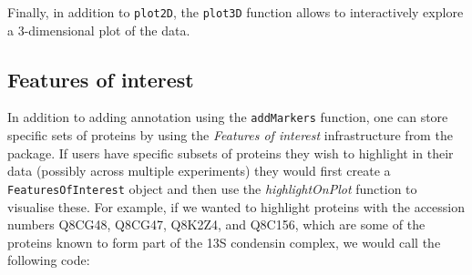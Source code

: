 Finally, in addition to \texttt{plot2D}, the \texttt{plot3D} function
allows to interactively explore a 3-dimensional plot of the data.

\pagebreak

\subsection*{Features of interest}
In addition to adding annotation using the \texttt{addMarkers}
function, one can store specific sets of proteins by using the
\textit{Features of interest} infrastructure from the
 package. If users have specific subsets of proteins
they wish to highlight in their data (possibly across multiple
experiments) they would first create a \texttt{FeaturesOfInterest}
object and then use the \textit{highlightOnPlot} function to 
visualise these. For example, if we wanted to highlight 
proteins with the accession numbers Q8CG48, Q8CG47, Q8K2Z4, and 
Q8C156, which are some of the proteins known to form part of the 
13S condensin complex, we would call the following code:


